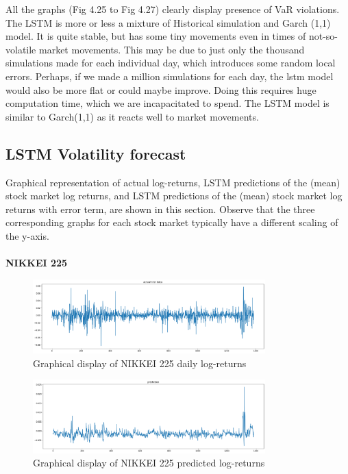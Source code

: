 \documentclass[a4paper,11pt,oneside]{book}
\begin{document}
All the graphs (Fig 4.25 to Fig 4.27) clearly display presence of VaR violations. The LSTM is more or less a mixture of Historical simulation and Garch (1,1) model. It is quite stable, but has some tiny movements even in times of not-so-volatile market movements. This may be due to just only the thousand simulations made for each individual day, which introduces some random local errors. Perhaps, if we made a million simulations for each day, the lstm model would also be more flat or could maybe improve. Doing this requires huge computation time, which we are incapacitated to spend. The LSTM model is similar to Garch(1,1) as it reacts well to market movements.

\subsection{LSTM Volatility forecast}
Graphical representation of actual log-returns, LSTM predictions of the (mean) stock market log returns, and LSTM predictions of the (mean) stock market log returns with error term, are shown in this section. Observe that the three corresponding graphs for each stock market typically have a different scaling of the y-axis.\\\\
\newpage
\textbf{NIKKEI 225}
\begin{figure}[!h]
	\centering
	\includegraphics[width=0.8\textwidth]{figures/NIKKEITEST}
	\caption{Graphical display of NIKKEI 225 daily log-returns}
	\label{NIKKEITEST}
	

\end{figure}
\begin{figure}[!h]
	\centering
	\includegraphics[width=0.8\textwidth]{figures/NIKKEIPRED}
	\caption{Graphical display of NIKKEI 225 predicted log-returns}
	\label{NIKKEIPRED}
\end{figure}
\end{document}

